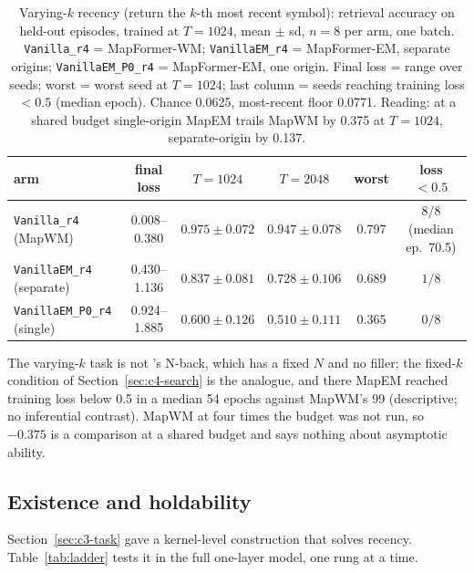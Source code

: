 \documentclass[10pt]{article}
\newcommand{\arm}[1]{\texttt{#1}}
\begin{document}
\begin{table}[t]
\centering
\small
\captionsetup{font=footnotesize,skip=4pt}
\caption{Varying-$k$ recency (return the $k$-th most recent symbol): retrieval accuracy on held-out episodes, trained at $T=1024$, mean $\pm$ sd, $n=8$ per arm, one batch. \arm{Vanilla\_r4} = MapFormer-WM; \arm{VanillaEM\_r4} = MapFormer-EM, separate origins; \arm{VanillaEM\_P0\_r4} = MapFormer-EM, one origin. Final loss = range over seeds; worst = worst seed at $T=1024$; last column = seeds reaching training loss $<0.5$ (median epoch). Chance 0.0625, most-recent floor 0.0771. Reading: at a shared budget single-origin MapEM trails MapWM by 0.375 at $T=1024$, separate-origin by 0.137.}
\label{tab:recency-em}
\begin{tabular}{@{}lccccc@{}}
\toprule
arm & final loss & $T=1024$ & $T=2048$ & worst & loss $<0.5$ \\
\midrule
\arm{Vanilla\_r4} (MapWM)           & 0.008--0.380 & $0.975\pm0.072$ & $0.947\pm0.078$ & 0.797 & $8/8$ (median ep.\ 70.5) \\
\arm{VanillaEM\_r4} (separate)      & 0.430--1.136 & $0.837\pm0.081$ & $0.728\pm0.106$ & 0.689 & $1/8$ \\
\arm{VanillaEM\_P0\_r4} (single)    & 0.924--1.885 & $0.600\pm0.126$ & $0.510\pm0.111$ & 0.365 & $0/8$ \\
\bottomrule
\end{tabular}
\end{table}

The varying-$k$ task is not \citet{whittington2025tale}'s N-back, which has a fixed $N$ and no filler; the
fixed-$k$ condition of Section~\ref{sec:c4-search} is the analogue, and there MapEM reached training loss below
0.5 in a median 54 epochs against MapWM's 99 (descriptive; no inferential contrast).
MapWM at four times the budget was not run, so $-0.375$ is a comparison at a shared budget and says
nothing about asymptotic ability. %

\subsection{Existence and holdability}
\label{sec:c4-ladder}

Section~\ref{sec:c3-task} gave a kernel-level construction that solves recency. Table~\ref{tab:ladder}
tests it in the full one-layer model, one rung at a time.
\end{document}
